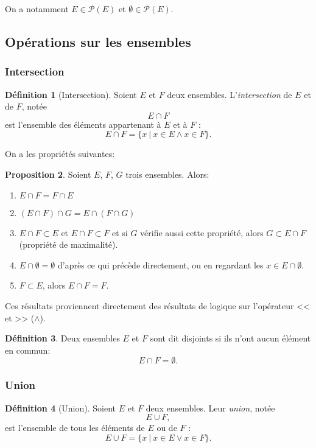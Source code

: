 \documentclass[11pt]{article}
\theoremstyle{definition}
\newtheorem{defn}{Définition}[section]
\newtheorem{prop}[defn]{Proposition}
\theoremstyle{remark}
\begin{document}
On a notamment $E\in\mathcal P(E)$ et $\emptyset\in\mathcal P(E)$.

\subsection{Opérations sur les ensembles}

\subsubsection{Intersection}

\begin{defn}[Intersection]
Soient $E$ et $F$ deux ensembles. L'\textit{intersection} de $E$ et de $F$, notée
\[E\cap F\]
est l'ensemble des éléments appartenant à $E$ et à $F$ :
\[E\cap F = \{x\ |\ x\in E\land x\in F\}.\]
\end{defn}

On a les propriétés suivantes:

\begin{prop}
Soient $E$, $F$, $G$ trois ensembles. Alors:
\begin{enumerate}
\item $E\cap F=  F\cap E$
\item $(E\cap F)\cap G = E\cap (F\cap G)$
\item $E\cap F\subset E$ et $E\cap F\subset F$ et si $G$ vérifie aussi cette propriété, alors $G\subset E\cap F$ (propriété de maximalité).
\item $E\cap\emptyset= \emptyset$ d'après ce qui précède directement, ou en regardant les $x\in E\cap\emptyset$.
\item $F\subset E$, alors $E\cap F=F$.
\end{enumerate}
\end{prop}

Ces résultats proviennent directement des résultats de logique sur l'opérateur << et >> ($\land$).

\begin{defn}
Deux ensembles $E$ et $F$ sont dit disjoints si ils n'ont aucun élément en commun:
\[E\cap F =\emptyset. \]
\end{defn}

\subsubsection{Union}

\begin{defn}[Union]
Soient $E$ et $F$ deux ensembles. Leur \textit{union}, notée
\[E\cup F,\]
est l'ensemble de tous les éléments de $E$ ou de $F$ :
\[E\cup F = \{x\ |\ x\in E\lor x\in F\}. \]
\end{defn}
\end{document}
